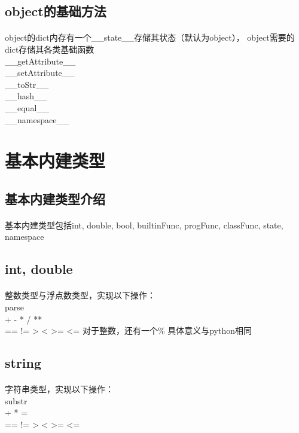 \documentclass[UTF8, 12pt, a4paper]{article}
\begin{document}
		\subsection{object的基础方法}
			\paragraph{}
				object的dict内存有一个\_\_state\_\_存储其状态（默认为object），
				object需要的dict存储其各类基础函数
			\\ \_\_getAttribute\_\_
			\\ \_\_setAttribute\_\_
			\\ \_\_toStr\_\_
			\\ \_\_hash\_\_
			\\ \_\_equal\_\_
			\\ \_\_namespace\_\_
	\section{基本内建类型}
		\subsection{基本内建类型介绍}
			\paragraph{}
				基本内建类型包括int, double, bool,
				builtinFunc, progFunc, classFunc, state, namespace
		\subsection{int, double}
			\paragraph{}
				整数类型与浮点数类型，实现以下操作：
				\\parse
				\\ + - * / **
				\\ == != > < >= <=
				对于整数，还有一个\%
				具体意义与python相同
		\subsection{string}
			\paragraph{}
				字符串类型，实现以下操作：
				\\substr
				\\ + * =
				\\ == != > < >= <=
\end{document}
